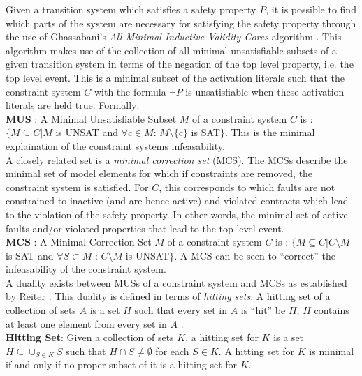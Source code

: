 Given a transition system which satisfies a safety property $P$, it is possible to find which parts of the system are necessary for satisfying the safety property through the use of Ghassabani's \textit{All Minimal Inductive Validity Cores} algorithm \cite{ghassabani2016efficient,ghassabani2017efficient}. This algorithm makes use of the collection of all minimal unsatisfiable subsets of a given transition system in terms of the negation of the top level property, i.e. the top level event. This is a minimal subset of the activation literals such that the constraint system $C$ with the formula $\neg P$ is unsatisfiable when these activation literals are held true. Formally: \\

\textbf{MUS} : A Minimal Unsatisfiable Subset $M$ of a constraint system $C$ is : $\{M \subseteq C | M$ is UNSAT and $\forall c \in M$: $M \setminus \{c\}$ is SAT$\}$. This is the minimal explaination of the constraint systems infeasability. \\

A closely related set is a \textit{minimal correction set} (MCS). The MCSs describe the minimal set of model elements for which if constraints are removed, the constraint system is satisfied. For $C$, this corresponds to which faults are not constrained to inactive (and are hence active) and violated contracts which lead to the violation of the safety property. In other words, the minimal set of active faults and/or violated properties that lead to the top level event.  \\

\textbf{MCS} : A Minimal Correction Set $M$ of a constraint system $C$ is : $\{M \subseteq C | C \setminus M$ is SAT and $\forall S \subset M$ : $C \setminus M$ is UNSAT$\}$. A MCS can be seen to ``correct'' the infeasability of the constraint system.\\

A duality exists between MUSs of a constraint system and MCSs as established by Reiter \cite{reiter1987theory}. This duality is defined in terms of \textit{hitting sets}. A hitting set of a collection of sets $A$ is a set $H$ such that every set in $A$ is ``hit'' be $H$; $H$ contains at least one element from every set in $A$ \cite{liffiton2016fast}. \\

\textbf{Hitting Set}: Given a collection of sets $K$, a hitting set for $K$ is a set $H \subseteq \cup_{S \in K} S$ such that $H \cap S \neq \emptyset$ for each $S  \in K$. A hitting set for $K$ is minimal if and only if no proper subset of it is a hitting set for $K$. \\

